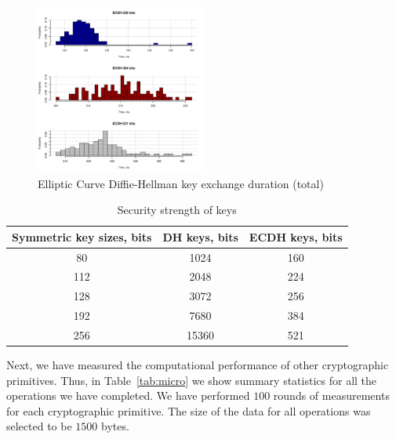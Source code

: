 \begin{figure}
	\includegraphics[width=0.5\textwidth]{graphics/ecdh_computation_hist.pdf}
	\caption{Elliptic Curve Diffie-Hellman key exchange duration (total)}
	\label{fig:ecdh}
\end{figure}

\begin{table}
\centering
\begin{tabular}{|c|c|c|}
\hline
\bf{Symmetric key sizes, bits} & \bf{DH keys, bits} & \bf{ECDH keys, bits} \\\hline
		80			&    1024                        & 160                                  \\
		112			&    2048                        & 224                                  \\
		128			&    3072                        & 256                                  \\
		192			&    7680                        & 384                                  \\
		256			&    15360                       & 521                                  \\
\hline
\end{tabular}
\caption{Security strength of keys}
\label{tab:strength}
\end{table}

Next, we have measured the computational performance of other 
cryptographic primitives. Thus, in Table~\ref{tab:micro} we 
show summary statistics for all the operations we have completed.
We have performed $100$ rounds of measurements for each 
cryptographic primitive. The size of the data for all operations
was selected to be $1500$ bytes.

